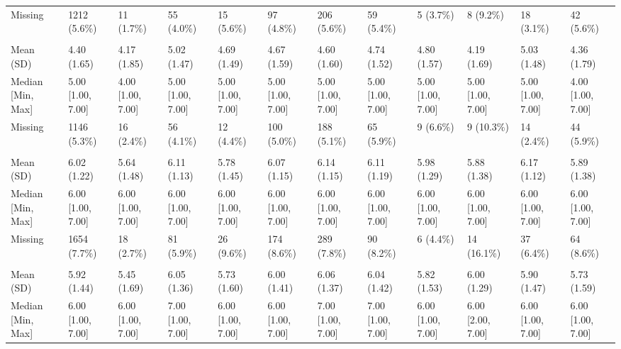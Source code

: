 \documentclass[
  single column]{article}
\begin{document}
\begin{landscape}
\begin{longtable}[t]{llllllllllll}
\hspace{1em}Missing & 1212 (5.6\%) & 11 (1.7\%) & 55 (4.0\%) & 15 (5.6\%) & 97 (4.8\%) & 206 (5.6\%) & 59 (5.4\%) & 5 (3.7\%) & 8 (9.2\%) & 18 (3.1\%) & 42 (5.6\%)\\
\addlinespace[0.3em]
\multicolumn{12}{l}{\textbf{Neighbourhood Community}}\\
\hspace{1em}Mean (SD) & 4.40 (1.65) & 4.17 (1.85) & 5.02 (1.47) & 4.69 (1.49) & 4.67 (1.59) & 4.60 (1.60) & 4.74 (1.52) & 4.80 (1.57) & 4.19 (1.69) & 5.03 (1.48) & 4.36 (1.79)\\
\hspace{1em}Median [Min, Max] & 5.00 [1.00, 7.00] & 4.00 [1.00, 7.00] & 5.00 [1.00, 7.00] & 5.00 [1.00, 7.00] & 5.00 [1.00, 7.00] & 5.00 [1.00, 7.00] & 5.00 [1.00, 7.00] & 5.00 [1.00, 7.00] & 5.00 [1.00, 7.00] & 5.00 [1.00, 7.00] & 4.00 [1.00, 7.00]\\
\hspace{1em}Missing & 1146 (5.3\%) & 16 (2.4\%) & 56 (4.1\%) & 12 (4.4\%) & 100 (5.0\%) & 188 (5.1\%) & 65 (5.9\%) & 9 (6.6\%) & 9 (10.3\%) & 14 (2.4\%) & 44 (5.9\%)\\
\addlinespace[0.3em]
\multicolumn{12}{l}{\textbf{Support - Help Availability}}\\
\hspace{1em}Mean (SD) & 6.02 (1.22) & 5.64 (1.48) & 6.11 (1.13) & 5.78 (1.45) & 6.07 (1.15) & 6.14 (1.15) & 6.11 (1.19) & 5.98 (1.29) & 5.88 (1.38) & 6.17 (1.12) & 5.89 (1.38)\\
\hspace{1em}Median [Min, Max] & 6.00 [1.00, 7.00] & 6.00 [1.00, 7.00] & 6.00 [1.00, 7.00] & 6.00 [1.00, 7.00] & 6.00 [1.00, 7.00] & 6.00 [1.00, 7.00] & 6.00 [1.00, 7.00] & 6.00 [1.00, 7.00] & 6.00 [1.00, 7.00] & 6.00 [1.00, 7.00] & 6.00 [1.00, \vphantom{1} 7.00]\\
\hspace{1em}Missing & 1654 (7.7\%) & 18 (2.7\%) & 81 (5.9\%) & 26 (9.6\%) & 174 (8.6\%) & 289 (7.8\%) & 90 (8.2\%) & 6 (4.4\%) & 14 (16.1\%) & 37 (6.4\%) & 64 (8.6\%)\\
\addlinespace[0.3em]
\multicolumn{12}{l}{\textbf{Support - No Guidance (Reversed)}}\\
\hspace{1em}Mean (SD) & 5.92 (1.44) & 5.45 (1.69) & 6.05 (1.36) & 5.73 (1.60) & 6.00 (1.41) & 6.06 (1.37) & 6.04 (1.42) & 5.82 (1.53) & 6.00 (1.29) & 5.90 (1.47) & 5.73 (1.59)\\
\hspace{1em}Median [Min, Max] & 6.00 [1.00, 7.00] & 6.00 [1.00, 7.00] & 7.00 [1.00, 7.00] & 6.00 [1.00, 7.00] & 6.00 [1.00, 7.00] & 7.00 [1.00, 7.00] & 7.00 [1.00, 7.00] & 6.00 [1.00, 7.00] & 6.00 [2.00, 7.00] & 6.00 [1.00, 7.00] & 6.00 [1.00, 7.00]\\

\end{longtable}
\end{landscape}
\end{document}
